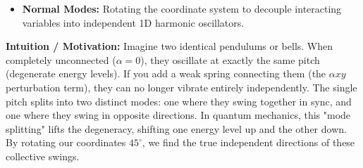 \begin{solution}
\begin{itemize}
\begin{itemize}
\begin{equation*}
\begin{pmatrix}
                \langle \psi_1 | V | \psi_1 \rangle & \langle \psi_1 | V | \psi_2 \rangle & \dots & \langle \psi_1 | V | \psi_g \rangle \\
                \langle \psi_2 | V | \psi_1 \rangle & \langle \psi_2 | V | \psi_2 \rangle & \dots & \langle \psi_2 | V | \psi_g \rangle \\
                \vdots & \vdots & \ddots & \vdots \\
                \langle \psi_g | V | \psi_1 \rangle & \langle \psi_g | V | \psi_2 \rangle & \dots & \langle \psi_g | V | \psi_g \rangle
            \end{pmatrix}
        \end{equation*}
        \item \textbf{Physical Meaning:} The diagonal elements $V_{ii}$ represent the energy shift of each individual state if they didn't "talk" to each other. The off-diagonal elements $V_{ij}$ represent the "mixing strength" or coupling between different states caused by the perturbation.
        \item \textbf{Diagonalization:} We solve the eigenvalue equation $\det(\mathbf{V} - E^{(1)}\mathbf{I}) = 0$. The resulting eigenvalues $\{E^{(1)}_1, E^{(1)}_2, \dots, E^{(1)}_g\}$ are the true first-order energy corrections. This process mathematically "chooses" the correct linear combinations of the original states that behave as stable eigenstates under the influence of $V$.
    \end{itemize}
    \item \textbf{Normal Modes:} Rotating the coordinate system to decouple interacting variables into independent 1D harmonic oscillators.
\end{itemize}

\textbf{Intuition / Motivation:}
Imagine two identical pendulums or bells. When completely unconnected ($\alpha = 0$), they oscillate at exactly the same pitch (degenerate energy levels). If you add a weak spring connecting them (the $\alpha x y$ perturbation term), they can no longer vibrate entirely independently. The single pitch splits into two distinct modes: one where they swing together in sync, and one where they swing in opposite directions. In quantum mechanics, this "mode splitting" lifts the degeneracy, shifting one energy level up and the other down. By rotating our coordinates $45^\circ$, we find the true independent directions of these collective swings.


\end{solution}
